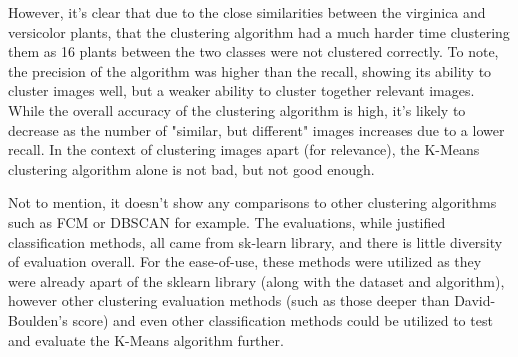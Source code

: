 \documentclass[10pt,twocolumn]{article}
\begin{document}
However, it's clear that due to the close similarities between the virginica and versicolor plants, that the clustering algorithm had a much harder time clustering them as 16 plants between the two classes were not clustered correctly. To note, the precision of the algorithm was higher than the recall, showing its ability to cluster images well, but a weaker ability to cluster together relevant images. While the overall accuracy of the clustering algorithm is high, it's likely to decrease as the number of "similar, but different" images increases due to a lower recall. In the context of clustering images apart (for relevance), the K-Means clustering algorithm alone is not bad, but not good enough.


Not to mention, it doesn't show any comparisons to other clustering algorithms such as FCM or DBSCAN for example. The evaluations, while justified classification methods, all came from sk-learn library, and there is little diversity of evaluation overall. For the ease-of-use, these methods were utilized as they were already apart of the sklearn library (along with the dataset and algorithm), however other clustering evaluation methods (such as those deeper than David-Boulden's score) and even other classification methods could be utilized to test and evaluate the K-Means algorithm further.

\end{document}
